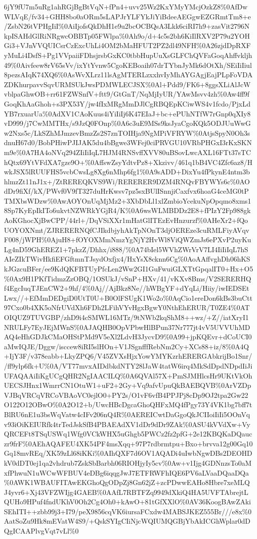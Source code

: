 \documentclass[]{article}
\begin{document}
6jY9fU7m5uRg1ahRGjBgBtVqN+fPn4+uvv25Wz2KxYMyYMcjOzkZ8\%0AfDwWLVqE/fv34+GHH8bo0aORm5sLAPJrYLFYkJiYiBdeeAEGgwEZGRmtTm8+e/ZsbN26tVPHgIiI\%0AiIjofsQkDhH1e9u2bcOCBQsA3Lkk6ciRI7h9+zasVit2796NkpISAHdGlRiNRgwcOBBTp05FWlpa\%0Ah9o/d+4c5s2bh6KiIlRXV2P79u2YOHGi3+VJnVVQUICsrCzExcUhLi4OM2bMaHFUT2PZ2dl49NFH\%0A26zjdDpRXFyMuLi4DsfS+Pg1VVpaiiFDhsjrsbGxKC0tbbHupUuXsGLFChQVFaGoqAhffvkljh49\%0Aivfeew8rV65sVv/ixYtYvnw5CgoKEBoaih07drTYbnJyMk6dOtXh/SEiIiIiul8pezsAIqK74XQ6\%0AsWvXLrz11lsAgMTERLzxxhvIyMhAYGAgjEajPLpFoVDAZDKhurpavvSqvURMSUkJwsPDMWLECJSX\%0Al+Pdd9/FK6+8ggsXLiAlJcWvblpaGhwOB+rr61FZWSnfV+ftt9/GtGnT/NqMjIyUR/YAwMsvv4zh\%0Aw4ff9fGoqKhAaGhoh+s3PX53Y/jw4fIxMRgMmDJlCgRBQEpKCiwWS4v1fcdo/PjxLdYB7rxuarUa\%0AdXV1CAoKuus4iYiIiIj6K47EIaJ+bc+ePUhNTfW7rGnp0qXIy8vD999/j7CwMMTHx/s9JzQ0FOnp\%0A6c3uE9MSs9ksJyaCgoKQk5ODJUuWwGw2Nxs5c/LkSZhMJmzevBmzZs2S7znTOIHja9NgMPiVFRYW\%0AtjsSpyN0Oh3sdnuH67d0/BobPHiwPJIJAK5du4bBgwe3WFej0ciPRVGU10VRbPHGxI3rKxSKNm9e\%0A7HA4oNVq294ZIiIiIqL7HJM4RNSvffXVV80uBSovLwcAXL16FTt37sTChQtx69YtVFdXA7gze9O+\%0AffswZsyYdtvPz8+Xkzivv/461q1bB4VC4Zfc6az8/HwkJSX5lRUUFHS5vcbCwsLg8Xg6nMhp6fg1\%0A9sADD+DixYu4fPkynE4ntm3bhlmzZt11nJ1x+/ZtREREQKVS9Wi/RERERER9DZM4RNQvFBYWYs6c\%0AOdDr9fiXf/kX/PWvf0V9fT327duHrKwsv7pz5sxBUlISnnjiCaxfvx6hoaG4ceMG0tPTMXbsWDzw\%0AwAOYOnUqMjMz2+3XbDbLl1xlZmbioYcekuNpOpqmo8xms18Sp7KyEpIkITo6ukvtNZWRkYGjR4/K\%0A6wsWLMBDDz2E8+fPIzY2Fp988gkAoKGhocXjBwCPP/44rl+/DqVSiXXr1mHatGlITEzEvHnzurzf\%0AHeXr2+fQoUOYOXNmt/ZJRERERNQfCJIkdbjyhAkTpNOnT3djOEREze3cuRMLFiyAVqvF008/jWPH\%0AjuH8+fOYOXMmNmzYgNjY2HvWl8ViQWZmJs6ePXvP2uyKuLg4nD59GhEREZ1+7pkzZ/Dhhx/i888/\%0A74bIel5WVhZWrVrV7LI4IiIiIqL7hSAIeZIkTWivHkfiEFGftmnTJsydOxfjx4/HxYsX8cknn6Cg\%0AoAAffvghDh06hKSkJGzcuBFer/ee9KdQKFBTUyPfcLen2Ww2GI1GuFwuiGLXTtGpqalIT0+Hx+O5\%0Ax9H1PKfTidmzZzOBQ/1OSUkJ/vSnP+HXv/41/vKXv8Bms/V2SERERHQf4EgcIuqTJEnCW2+9hf/4\%0Aj//AjBkz8Ne//hWBgYF+dYqLi/Hiiy/iwIEDSEtLwx//+EfMmDEDgiD0UtT0U+B0OlFSUgK1Wo2o\%0AqCio1ereDon6kBs3buCtt97Cxo0b4XK5oNfrUVdXh6FDh2LFihVYvHgxBgwY0NthEhERUR/T0ZE4\%0ATOIQUZ9TUVGBP/zhD9i4cSMWL16MTz/9tNWb2kqShM8++wz/+Z//iatXryI1NRULFy7EyJEjMWnS\%0AJAQHB0OpVPbwHlBPun37Nr777jt4vV5UVVUhMDAQ4eHhGDJkCMaOHStPMd9V5eXl2LdvH3JycvD9\%0A99+jpKQEvr+dCoUCI0aMwIQJE/Dggw/isccew8iRI5slHOn+V1JSgnfffRebNm2Cy+XCs88+iz/8\%0A4Q+IjY3F/v378eabb+LkyZPQ6/V45ZVXsHjxYowYMYKzrhERERGAbkrijBo1Snr//ff9ylp6fk+U\%0A/VT77mvxAIDdbkdNTY28lJaW4tatW6irq4MkSdDpdNDpdIiJiUFAQAAiIiKgUCgQHR2NgIAACILQ\%0A6QVAl57X+PmSJMHlcsHr9UKtVkOhUECSJHnx1WmrrCN1OtuW1+uF2+2Gy+Vq9afvUpuQkBAEBQVB\%0ArVZDpVJBqVRCqVRCoVBAoVC0ejlO0+PY2s/O1vF6vfB4PPJPj8cDp9OJ2tpa2Gw22O122O12OBwO\%0A2O12+b/UwcHBcDgcaGhoQHFxMQ4fPgy73Y4VK1bg7bff7tBlRU6nE1u3bsWqVatw4cIFv206nQ4R\%0AEREICwtDaGgoQkJCIIoiIiIi5OOnVqv93iOiKEIURfk4trTedJskSfB4PBAEAdXV1dDr9dDr9ZAk\%0ASU4kVVdXw+VyQRCEFt8TSqUSWq1Wfg0VCkWHX5uGhgb5PWCz2fz2pfG+2e12KBQKaDQauczr9frF\%0AEhAQAFEU4XK54PF4msXqq+97P7rdbrmtpu+Bxo+brvva12g00Gq10Gq18mvREq/XK59zLl68iKKi\%0AIhQXF7d6OV1AQADi4uIwbNgwDBs2DEOHDkV0dDT0ej1qa2vhdrub7ZskSbBarbh06RIOHjyIy5cv\%0Aw+v1Ijg4GDNnzsTo0aMxfPhwuN1uWCwWFBUV4eDBg6iqqgJwJ7ETFRWFhIQE6PV6aLVaaDQaaDQa\%0AWK1WBAUFITAwEKGhoQgODpZj8Gn62jZ+zcPDwwEAHo8Hbre7xeMLQJ4yvr6+Xj43VFZWIjg4GAEB\%0AAfL7RBTFZq9949dXkiQ4HA5UVFTAbrejtLQUHo9HPuf4fndUKhV0Oh2Cg4Oh0+kAwO+81tGfXXlO\%0AV36KoogBAwZAkiSEhITI++zbb99j3+I79/peX9856cqVK6iursaFCxdw4MABSJKEZ555Br///e8x\%0AatSoZu9Hk8mEVatW4S9/+QskSYIgCIiNjcWQIUMQGBjYbAkICGhWplar0dDQgICAAPlvgVqt7vLl\%0
\end{document}
